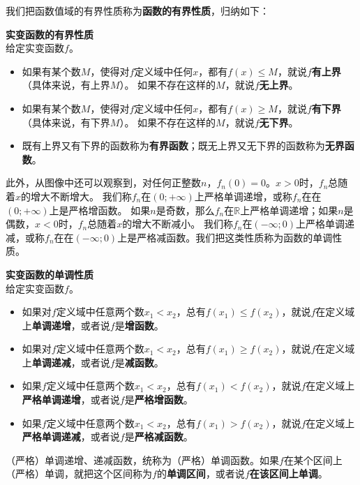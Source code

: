 \documentclass[12pt,UTF8,fontset=none]{ctexbook}
\begin{document}
我们把函数值域的有界性质称为\textbf{函数的有界性质}，归纳如下：
\begin{df}\textbf{实变函数的有界性质}\\
    给定实变函数$f$。
    \begin{itemize}
        \item 如果有某个数$M$，使得对$f$定义域中任何$x$，都有$f(x)\leqslant M$，就说$f$\textbf{有上界} （具体来说，有上界$M$）。
        如果不存在这样的$M$，就说$f$\textbf{无上界}。
        \item 如果有某个数$M$，使得对$f$定义域中任何$x$，都有$f(x)\geqslant M$，就说$f$\textbf{有下界} （具体来说，有下界$M$）。
        如果不存在这样的$M$，就说$f$\textbf{无下界}。
        \item 既有上界又有下界的函数称为\textbf{有界函数}；既无上界又无下界的函数称为\textbf{无界函数}。
    \end{itemize}
\end{df}

此外，从图像中还可以观察到，对任何正整数$n$，$f_n(0) = 0$。$x>0$时，$f_n$总随着$x$的增大不断增大。
我们称$f_n$在$(0; +\infty)$上严格单调递增，或称$f_n$在在$(0; +\infty)$上是严格增函数。
如果$n$是奇数，那么$f_n$在$\mathbb{R}$上严格单调递增；如果$n$是偶数，$x<0$时，$f_n$总随着$x$的增大不断减小。
我们称$f_n$在$(-\infty; 0)$上严格单调递减，或称$f_n$在在$(-\infty; 0)$上是严格减函数。我们把这类性质称为函数的单调性质。
\begin{df}\textbf{实变函数的单调性质}\\
    给定实变函数$f$。
    \begin{itemize}
        \item 如果对$f$定义域中任意两个数$x_1 < x_2$，总有$f(x_1) \leqslant f(x_2)$，就说$f$在定义域上\textbf{单调递增}，或者说$f$是\textbf{增函数}。
        \item 如果对$f$定义域中任意两个数$x_1 < x_2$，总有$f(x_1) \geqslant f(x_2)$，就说$f$在定义域上\textbf{单调递减}，或者说$f$是\textbf{减函数}。
        \item 如果$f$定义域中任意两个数$x_1 < x_2$，总有$f(x_1) < f(x_2)$，就说$f$在定义域上\textbf{严格单调递增}，或者说$f$是\textbf{严格增函数}。
        \item 如果$f$定义域中任意两个数$x_1 < x_2$，总有$f(x_1) > f(x_2)$，就说$f$在定义域上\textbf{严格单调递减}，或者说$f$是\textbf{严格减函数}。   
    \end{itemize}
\end{df}

（严格）单调递增、递减函数，统称为（严格）单调函数。如果$f$在某个区间上（严格）单调，就把这个区间称为$f$的\textbf{单调区间}，或者说$f$\textbf{在该区间上单调}。
\end{document}
